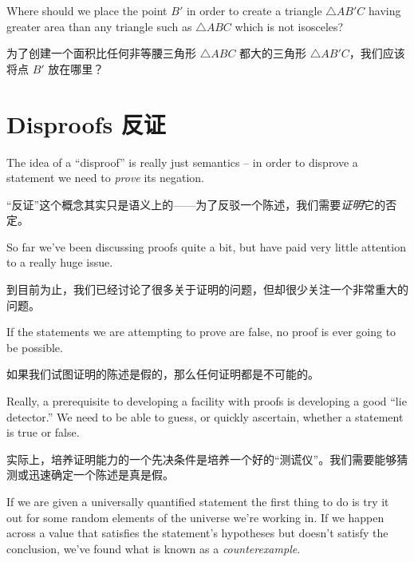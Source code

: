 \begin{exer}
Where should we place the point $B'$ in order to create a triangle  
$\triangle AB'C$ having
greater area than any triangle such as $\triangle ABC$ which is not isosceles?

为了创建一个面积比任何非等腰三角形 $\triangle ABC$ 都大的三角形 $\triangle AB'C$，我们应该将点 $B'$ 放在哪里？
\begin{center}

\end{center}

\end{exer}
\clearpage




\newpage


\section{Disproofs 反证}
\label{sec:disproofs}

The idea of a ``disproof'' is really just semantics -- in order to
disprove a statement we need to \emph{prove} its negation.

“反证”这个概念其实只是语义上的——为了反驳一个陈述，我们需要\emph{证明}它的否定。

So far we've been discussing proofs quite a bit, but have paid
very little attention to a really huge issue.

到目前为止，我们已经讨论了很多关于证明的问题，但却很少关注一个非常重大的问题。

If the statements
we are attempting to prove are false, no proof is ever going to
be possible.

如果我们试图证明的陈述是假的，那么任何证明都是不可能的。

Really, a prerequisite to developing a facility with
proofs is developing a good ``lie detector.''   We need to be able to 
guess, or quickly ascertain, whether a statement is true or false.

实际上，培养证明能力的一个先决条件是培养一个好的“测谎仪”。我们需要能够猜测或迅速确定一个陈述是真是假。

If we are given a universally quantified statement the first thing to
do is try it out for some random elements of the universe we're working
in.  If we happen across a value that satisfies the statement's hypotheses
but doesn't satisfy the conclusion, we've found what is known as a 
\emph{counterexample}.

